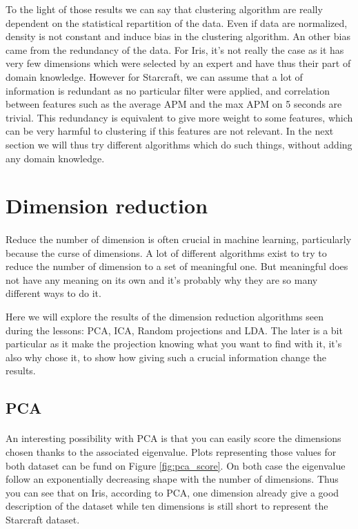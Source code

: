 \documentclass[twocolumn,a4paper,10pt]{article}
\begin{document}
To the light of those results we can say that clustering algorithm are really dependent on the statistical repartition of the data. Even if data are normalized, density is not constant and induce bias in the clustering algorithm. An other bias came from the redundancy of the data. For Iris, it's not really the case as it has very few dimensions which were selected by an expert and have thus their part of domain knowledge. However for Starcraft, we can assume that a lot of information is redundant as no particular filter were applied, and correlation between features such as the average APM and the max APM on 5 seconds are trivial. This redundancy is equivalent to give more weight to some features, which can be very harmful to clustering if this features are not relevant. In the next section we will thus try different algorithms which do such things, without adding any domain knowledge.


\section{Dimension reduction} \label{dr}
\paragraph{}
Reduce the number of dimension is often crucial in machine learning, particularly because the curse of dimensions. A lot of different algorithms exist to try to reduce the number of dimension to a set of meaningful one. But meaningful does not have any meaning on its own and it's probably why they are so many different ways to do it.

Here we will explore the results of the dimension reduction algorithms seen during the lessons: PCA, ICA, Random projections and LDA. The later is a bit particular as it make the projection knowing what you want to find with it, it's also why chose it, to show how giving such a crucial information change the results.

\subsection{PCA}
\paragraph{}
An interesting possibility with PCA is that you can easily score the dimensions chosen thanks to the associated eigenvalue. Plots representing those values for both dataset can be fund on Figure \ref{fig:pca_score}. On both case the eigenvalue follow an exponentially decreasing shape with the number of dimensions. Thus you can see that on Iris, according to PCA, one dimension already give a good description of the dataset while ten dimensions is still short to represent the Starcraft dataset.
\end{document}
